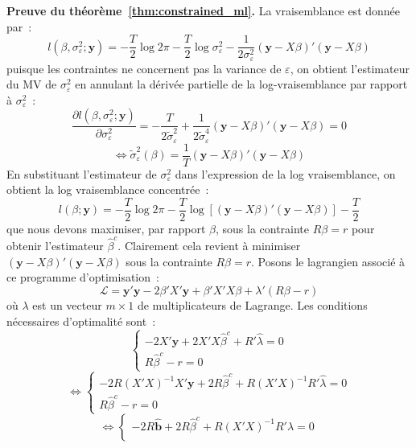 \documentclass[10pt,a4paper]{article}
\theoremstyle{definition}
\begin{document}
\begin{notes}

  \textbf{Preuve du théorème~\ref{thm:constrained_ml}.} La vraisemblance est donnée par~:
  \[
    l\left( \beta, \sigma_{\varepsilon}^2; \mathbf y \right) = -\frac{T}{2}\log 2\pi - \frac{T}{2} \log\sigma_{\varepsilon}^2 - \frac{1}{2\sigma_{\varepsilon}^2}\left( \mathbf y - X\beta \right)'\left( \mathbf y - X\beta \right)
  \]
  puisque les contraintes ne concernent pas la variance de $\varepsilon$, on obtient l'estimateur du MV de $\sigma_{\varepsilon}^2$ en annulant la dérivée partielle de la log-vraisemblance par rapport à $\sigma_{\varepsilon}^2$~:
  \[
    \frac{\partial l\left( \beta, \sigma_{\varepsilon}^2; \mathbf y \right)}{\partial \sigma_{\varepsilon}^2} = -\frac{T}{2\tilde\sigma_{\varepsilon}^2} + \frac{1}{2\tilde\sigma_{\varepsilon}^4}\left(\mathbf y - X\beta \right)'\left(\mathbf y - X\beta\right) = 0
  \]
  \[
    \Leftrightarrow \tilde \sigma_{\varepsilon}^2(\beta) = \frac{1}{T}\left(\mathbf y - X\beta \right)'\left(\mathbf y - X\beta  \right)
  \]
  En substituant l'estimateur de $\sigma_{\varepsilon}^2$ dans l'expression de la log vraisemblance, on obtient la log vraisemblance concentrée~:
  \[
    l\left( \beta ; \mathbf y \right) = -\frac{T}{2}\log 2\pi - \frac{T}{2}\log\left[\left(\mathbf y - X\beta \right)'\left(\mathbf y - X\beta  \right)\right] - \frac{T}{2}
  \]
  que nous devons maximiser, par rapport $\beta$, sous la contrainte $R\beta=r$ pour obtenir l'estimateur $\hat\beta^c$. Clairement cela revient à minimiser $\left(\mathbf y - X\beta \right)'\left(\mathbf y - X\beta  \right)$ sous la contrainte $R\beta=r$. Posons le lagrangien associé à ce programme d'optimisation~:
  \[
    \mathcal L = \mathbf y'\mathbf y - 2\beta'X'\mathbf y + \beta'X'X\beta + \lambda'\left( R\beta-r\right)
  \]
  où $\lambda$ est un vecteur $m\times 1$ de multiplicateurs de Lagrange. Les conditions nécessaires d'optimalité sont~:
  \[
    \begin{cases}
      -2X'\mathbf y + 2X'X\hat\beta^c + R'\hat\lambda = 0\\
      R\hat\beta^c -r = 0
    \end{cases}
  \]
\[
    \Leftrightarrow\begin{cases}
      -2R(X'X)^{-1}X'\mathbf y + 2R\hat\beta^c + R(X'X)^{-1}R'\hat\lambda = 0\\
      R\hat\beta^c -r = 0
    \end{cases}
  \]
  \[
    \Leftrightarrow\begin{cases}
      -2R\hat{\mathbf b} + 2R\hat\beta^c + R(X'X)^{-1}R'\hat\lambda = 0\\

\end{cases}\]
\end{notes}
\end{document}
